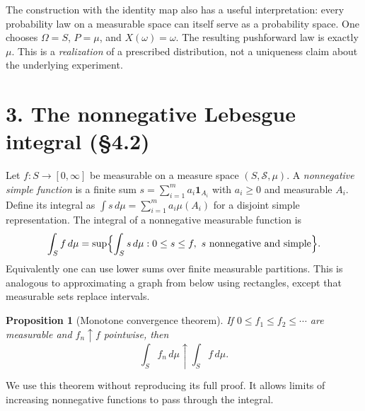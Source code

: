 \documentclass[10pt,a4paper]{article}
\newtheorem{proposition}{Proposition}
\begin{document}
The construction with the identity map also has a useful interpretation: every probability law on a measurable space can itself serve as a probability space. One chooses $\Omega=S$, $P=\mu$, and $X(\omega)=\omega$. The resulting pushforward law is exactly $\mu$. This is a \emph{realization} of a prescribed distribution, not a uniqueness claim about the underlying experiment.

\section*{3. The nonnegative Lebesgue integral (\S4.2)}
Let $f:S\to[0,\infty]$ be measurable on a measure space $(S,\mathcal S,\mu)$. A \emph{nonnegative simple function} is a finite sum $s=\sum_{i=1}^{m}a_i\mathbf1_{A_i}$ with $a_i\ge0$ and measurable $A_i$. Define its integral as $\int s\,d\mu=\sum_{i=1}^{m}a_i\mu(A_i)$ for a disjoint simple representation. The integral of a nonnegative measurable function is
\[
\int_S f\,d\mu
=\sup\Bigl\{\int_S s\,d\mu:
 0\le s\le f,\ s\text{ nonnegative and simple}\Bigr\}.
\]
Equivalently one can use lower sums over finite measurable partitions. This is analogous to approximating a graph from below using rectangles, except that measurable sets replace intervals.

\begin{center}
\end{center}
\begin{proposition}[Monotone convergence theorem]
If $0\le f_1\le f_2\le\cdots$ are measurable and $f_n\uparrow f$ pointwise, then
\[
\int_S f_n\,d\mu\uparrow\int_S f\,d\mu.
\]
\end{proposition}
We use this theorem without reproducing its full proof. It allows limits of increasing nonnegative functions to pass through the integral.
\end{document}
